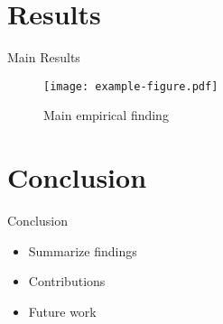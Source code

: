 \documentclass{beamer}
\begin{document}
\section{Results}

\begin{frame}{Main Results}
  \begin{figure}
    \centering
    \texttt{[image: example-figure.pdf]}
    \caption{Main empirical finding}
  \end{figure}
\end{frame}

\section{Conclusion}

\begin{frame}{Conclusion}
  \begin{itemize}
    \item Summarize findings
    \item Contributions
    \item Future work
  \end{itemize}
\end{frame}
\end{document}
